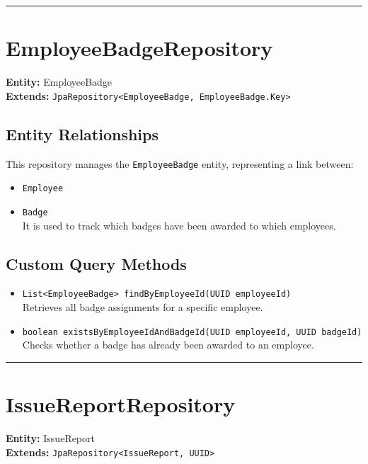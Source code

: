 \documentclass[12pt]{article}
\begin{document}
\hrule
\vspace{1em}

\section{EmployeeBadgeRepository}

\textbf{Entity:} EmployeeBadge \\
\textbf{Extends:} \texttt{JpaRepository<EmployeeBadge, EmployeeBadge.Key>}

\subsection*{Entity Relationships}
This repository manages the \texttt{EmployeeBadge} entity, representing a link between:
\begin{itemize}
    \item \texttt{Employee}
    \item \texttt{Badge} \\

    It is used to track which badges have been awarded to which employees.


\end{itemize}

\subsection*{Custom Query Methods}
\begin{itemize}
    \item \texttt{List<EmployeeBadge> findByEmployeeId(UUID employeeId)} \\
    Retrieves all badge assignments for a specific employee.

    \item \texttt{boolean existsByEmployeeIdAndBadgeId(UUID employeeId, UUID badgeId)} \\
    Checks whether a badge has already been awarded to an employee.
\end{itemize}

\hrule
\vspace{1em}

\section{IssueReportRepository}

\textbf{Entity:} IssueReport \\
\textbf{Extends:} \texttt{JpaRepository<IssueReport, UUID>}
\end{document}
